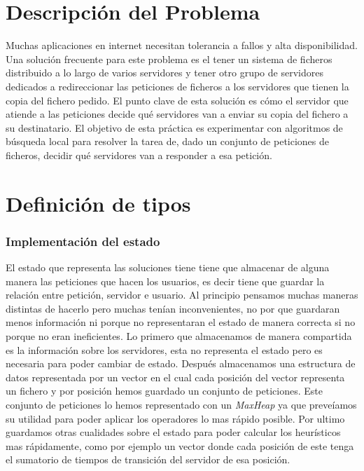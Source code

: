 \documentclass[a4paper,10pt]{report}
\begin{document}
    \chapter*{Descripción del Problema}
    
        Muchas aplicaciones en internet necesitan tolerancia a fallos y alta disponibilidad. Una solución frecuente para este problema es el tener un sistema de ficheros distribuido a lo largo de varios servidores y tener otro grupo de servidores dedicados a redireccionar las peticiones de ficheros a los servidores que tienen la copia del fichero pedido.\newline\newline
        El punto clave de esta solución es cómo el servidor que atiende a las peticiones decide qué servidores van a enviar su copia del fichero a su destinatario. El objetivo de esta práctica es experimentar con algoritmos de búsqueda local para resolver la tarea de, dado un conjunto de peticiones de ficheros, decidir qué servidores van a responder a esa petición.
        
        
    \chapter*{Definición de tipos }
    
        \subsection*{Implementación del estado}
            El estado que representa las soluciones tiene tiene que almacenar de alguna manera las peticiones 
            que hacen los usuarios, es decir tiene que guardar la relación entre petición, servidor e usuario. 
            Al principio pensamos muchas maneras distintas de hacerlo pero muchas tenían inconvenientes, no por que guardaran menos información ni porque no representaran el estado de manera correcta si no porque no eran ineficientes. Lo primero que almacenamos de manera compartida es la información sobre los servidores, esta no representa el estado pero es necesaria para poder cambiar de estado. Después almacenamos una estructura de datos representada por un vector en el cual cada posición del vector representa un fichero y por posición hemos guardado un conjunto de peticiones. Este conjunto de peticiones lo hemos representado con un \textit{MaxHeap} ya que preveíamos su utilidad para poder aplicar los operadores lo mas rápido posible. Por ultimo guardamos otras cualidades sobre el estado para poder calcular los heurísticos mas rápidamente, como por ejemplo un vector donde cada posición de este tenga el sumatorio de tiempos de transición del servidor de esa posición. 
    
\end{document}
